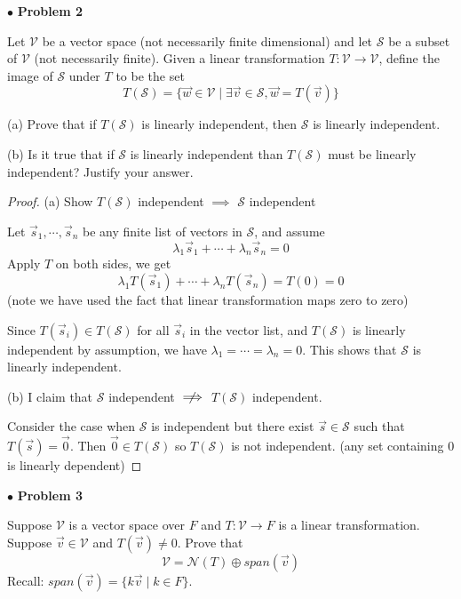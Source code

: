 \documentclass{article}
\begin{document}
\newpage
$ \bullet$ \textbf{Problem 2}
\medskip

\begin{itshape}
Let $\mathcal{V}$ be a vector space (not necessarily finite dimensional) and let $\mathcal{S}$ be a subset of $\mathcal{V}$ (not necessarily finite). Given a linear transformation $T: \mathcal{V} \to \mathcal{V}$, define the image of $\mathcal{S}$ under $T$ to be the set
$$T(\mathcal{S}) = \{ \vec{w} \in \mathcal{V} \; | \; \exists \vec{v} \in \mathcal{S}, \vec{w} = T(\vec{v}) \}$$

(a) Prove that if $T(\mathcal{S})$ is linearly independent, then $\mathcal{S}$ is linearly independent.
\medskip

(b) Is it true that if $\mathcal{S}$ is linearly independent than $T(\mathcal{S})$ must be linearly independent? Justify your answer.
\end{itshape}
\medskip

\begin{proof}
(a) Show $T(\mathcal{S})$ independent $\implies$ $\mathcal{S}$ independent

Let $\vec{s}_1, \cdots, \vec{s}_n$ be any finite list of vectors in $\mathcal{S}$, and assume $$\lambda_1 \vec{s}_1 + \cdots + \lambda_n \vec{s}_n =0$$
Apply $T$ on both sides, we get
 $$\lambda_1 T(\vec{s}_1) + \cdots + \lambda_n T(\vec{s}_n) = T(0) = 0$$
 (note we have used the fact that linear transformation maps zero to zero)
 
 Since $T(\vec{s}_i )\in T(\mathcal{S})$ for all $\vec{s}_i$ in the vector list, and $T(\mathcal{S})$ is linearly independent by assumption, we have $\lambda_1 = \cdots = \lambda_n = 0$. This shows that $\mathcal{S}$ is linearly independent. 
 \bigskip
 
 (b) I claim that $\mathcal{S}$ independent $\centernot\implies$ $T(\mathcal{S})$ independent.
 
 Consider the case when $\mathcal{S}$ is independent but there exist $\vec{s} \in \mathcal{S}$ such that $T(\vec{s}) = \vec{0}$. Then $\vec{0} \in T(\mathcal{S})$ so $T (\mathcal{S})$ is not independent. (any set containing 0 is linearly dependent)
\end{proof}

\newpage
$ \bullet$ \textbf{Problem 3}
\medskip

\begin{itshape}
Suppose $\mathcal{V}$ is a vector space over $F$ and $T: \mathcal{V} \to F$ is a linear transformation. Suppose $\vec{v} \in \mathcal{V}$ and $T(\vec{v}) \ne 0$. Prove that 
$$\mathcal{V} = \mathcal{N}(T) \oplus span(\vec{v})$$ 
Recall: $span(\vec{v}) = \{ k\vec{v} \; | \; k \in F\}$.
\end{itshape}
\medskip
\end{document}
